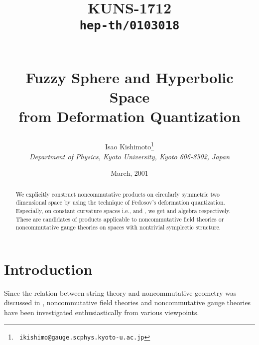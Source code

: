 \documentclass[12pt,a4paper]{article}
\begin{document}
\begin{titlepage}
\title{
\hfill\parbox{4cm}
{\normalsize KUNS-1712\\{\tt hep-th/0103018}}\\
\vspace{1cm}
Fuzzy Sphere and Hyperbolic Space\\ from Deformation Quantization}
\author{
Isao {\sc Kishimoto}\thanks{{\tt
    ikishimo@gauge.scphys.kyoto-u.ac.jp}}
\\[7pt]
{\it Department of Physics, Kyoto University, Kyoto 606-8502, Japan}
}
\date{\normalsize March, 2001}
\maketitle
\thispagestyle{empty}

\begin{abstract}
\normalsize
We explicitly construct noncommutative \myHighlight{$*$}\coordHE{} products on circularly
symmetric two dimensional space by using the technique of  Fedosov's
deformation quantization. Especially, on constant curvature spaces
i.e., \coordHE{} and \coordHE{}, we get \coordHE{} and \coordHE{} algebra
respectively. These are candidates of \myHighlight{$*$}\coordHE{} products applicable to
noncommutative field theories or noncommutative gauge theories on
spaces with nontrivial symplectic structure.
\end{abstract}

 
\end{titlepage}



\section{Introduction}

Since the relation between string theory and noncommutative geometry
was discussed in \cite{SW}, noncommutative field theories and
noncommutative gauge theories have been investigated enthusiastically
from various viewpoints.
\end{document}
